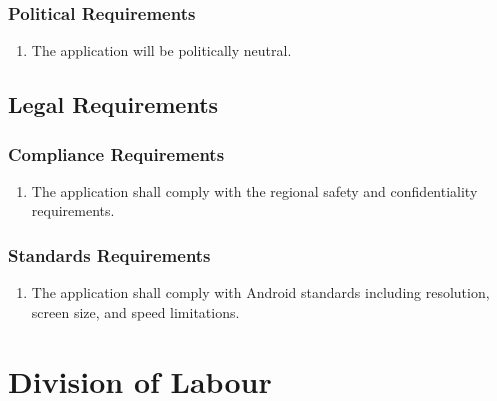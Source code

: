 \documentclass[titlepage]{article}
\newcounter{myCounter}
\begin{document}
\subsubsection{Political Requirements}
\label{ssub:political_requirements}
\begin{enumerate}[{CP}1. ]
    \setcounter{enumi}{\themyCounter}
	\item The application will be politically neutral.
    \setcounter{myCounter}{\theenumi}
\end{enumerate}


\subsection{Legal Requirements}
\label{sub:legal_requirements}
\setcounter{myCounter}{0}

\subsubsection{Compliance Requirements}
\label{ssub:compliance_requirements}
\begin{enumerate}[{LR}1. ]
    \setcounter{enumi}{\themyCounter}
	\item The application shall comply with the regional safety and confidentiality requirements.
    \setcounter{myCounter}{\theenumi}
\end{enumerate}

\subsubsection{Standards Requirements}
\label{ssub:standards_requirements}
\begin{enumerate}[{LR}1. ]
    \setcounter{enumi}{\themyCounter}
    \item The application shall comply with Android standards including resolution, screen size, and
speed limitations.
    \setcounter{myCounter}{\theenumi}
\end{enumerate}



\newpage
\appendix
\section{Division of Labour}%
\label{sec:division_of_labour}
\end{document}
